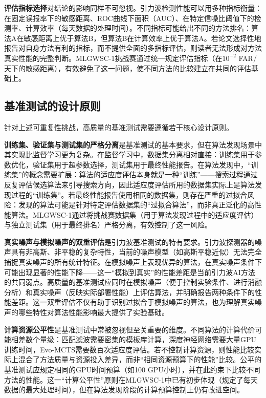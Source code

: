 \textbf{评估指标选择}对结论的影响同样不可忽视。引力波检测性能可以用多种指标衡量：在固定误报率下的敏感距离、ROC曲线下面积（AUC）、在特定信噪比阈值下的检测率、计算效率（每天数据的处理时间）。不同指标可能给出不同的方法排名：算法A在敏感距离上优于算法B，但算法B在计算效率上优于算法A。若论文选择性地报告对自身方法有利的指标，而不提供全面的多指标评估，则读者无法形成对方法真实性能的完整判断。MLGWSC-1挑战赛通过统一规定评估指标（在$10^{-2}$ FAR/天下的敏感距离），有效避免了这一问题，使不同方法的比较建立在共同的评估基础上。

\subsection*{基准测试的设计原则}

针对上述可重复性挑战，高质量的基准测试需要遵循若干核心设计原则。

\textbf{训练集、验证集与测试集的严格分离}是基准测试的基本要求，但在算法发现场景中其实现比监督学习更为复杂。在监督学习中，数据集分离相对直接：训练集用于参数优化，验证集用于超参数选择，测试集用于最终性能报告。在算法发现中，“训练集”的概念需要扩展：算法的适应度评估本身就是一种“训练”——搜索过程通过反复评估候选算法来引导搜索方向，因此适应度评估所用的数据集实际上是算法发现过程的“训练集”。若最终性能报告使用相同的数据集，则存在严重的过拟合风险：发现的算法可能是针对特定评估数据集的“过拟合算法”，而非真正泛化的高性能算法。MLGWSC-1通过将挑战赛数据集（用于算法发现过程中的适应度评估）与独立测试集（用于最终排名）严格分离，有效控制了这一风险。

\textbf{真实噪声与模拟噪声的双重评估}是引力波基准测试的特有要求。引力波探测器的噪声具有非高斯、非平稳的复杂特性，当前的噪声模型（如高斯平稳近似）无法完全捕捉真实噪声的所有统计特征。在模拟噪声上表现优异的算法，在真实噪声条件下可能出现显著的性能下降——这一“模拟到真实”的性能差距是当前引力波AI方法的共同弱点。高质量的基准测试应同时在模拟噪声（便于控制实验条件、进行消融分析）和真实噪声（反映实际部署性能）上评估算法，并明确报告两种条件下的性能差距。这一双重评估不仅有助于识别过拟合于模拟噪声的算法，也为理解真实噪声的哪些特性对算法性能影响最大提供了实验基础。

\textbf{计算资源公平性}是基准测试中常被忽视但至关重要的维度。不同算法的计算代价可能相差数个量级：匹配滤波需要密集的模板库计算，深度神经网络需要大量GPU训练时间，Evo-MCTS需要数百次适应度评估。若不控制计算资源，则性能比较实际上混合了方法质量与资源投入差异，而非“相同资源预算下的性能”比较。公平的基准测试应规定相同的GPU时间预算（如100 GPU小时），并在此约束下比较不同方法的性能。这一“计算公平性”原则在MLGWSC-1中已有初步体现（规定了每天数据的最大处理时间），但在算法发现阶段的计算预算控制上仍有改进空间。

